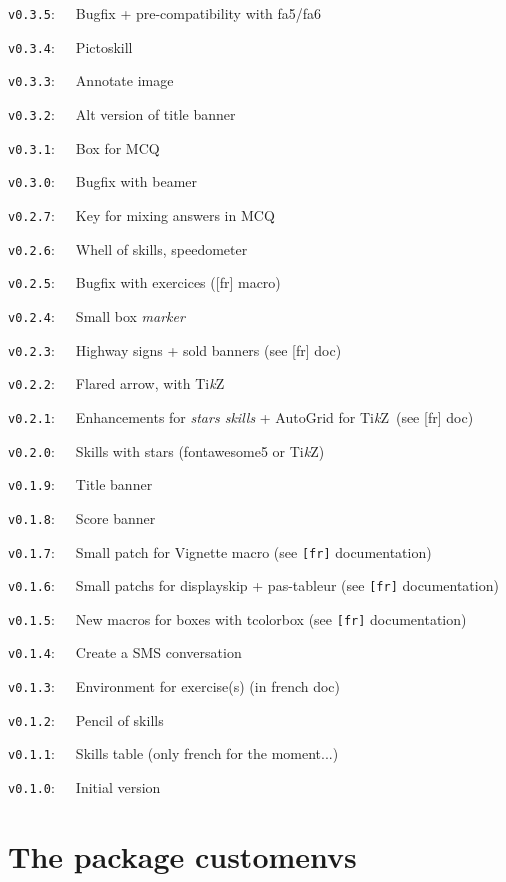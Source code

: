 \documentclass[english,11pt,a4paper]{article}
\providecommand\tikzlogo{Ti\textit{k}Z}
\let\TikZ\tikzlogo
\begin{document}
\verb|v0.3.5|:~~~Bugfix + pre-compatibility with \textsf{fa5/fa6}

\verb|v0.3.4|:~~~Pictoskill

\verb|v0.3.3|:~~~Annotate image

\verb|v0.3.2|:~~~Alt version of title banner

\verb|v0.3.1|:~~~Box for MCQ

\verb|v0.3.0|:~~~Bugfix with \textsf{beamer}

\verb|v0.2.7|:~~~Key for mixing answers in MCQ

\verb|v0.2.6|:~~~Whell of skills, speedometer

\verb|v0.2.5|:~~~Bugfix with exercices (\textsf{[fr]} macro)

\verb|v0.2.4|:~~~Small box \textit{marker}

\verb|v0.2.3|:~~~Highway signs + sold banners (see \textsf{[fr]} doc)

\verb|v0.2.2|:~~~Flared arrow, with \TikZ

\verb|v0.2.1|:~~~Enhancements for \textit{stars skills} + AutoGrid for \TikZ\ (see \textsf{[fr]} doc)

\verb|v0.2.0|:~~~Skills with stars (\textsf{fontawesome5} or \TikZ)

\verb|v0.1.9|:~~~Title banner

\verb|v0.1.8|:~~~Score banner

\verb|v0.1.7|:~~~Small patch for \textsf{Vignette} macro (see \texttt{[fr]} documentation)

\verb|v0.1.6|:~~~Small patchs for \textsf{displayskip} + \textsf{pas-tableur} (see \texttt{[fr]} documentation)

\verb|v0.1.5|:~~~New macros for boxes with \textsf{tcolorbox} (see \texttt{[fr]} documentation)

\verb|v0.1.4|:~~~Create a SMS conversation

\verb|v0.1.3|:~~~Environment for exercise(s) (in french doc)

\verb|v0.1.2|:~~~Pencil of skills

\verb|v0.1.1|:~~~Skills table (only french for the moment...)

\verb|v0.1.0|:~~~Initial version

\vspace*{5mm}

\pagebreak

\section{The package customenvs}
\end{document}
